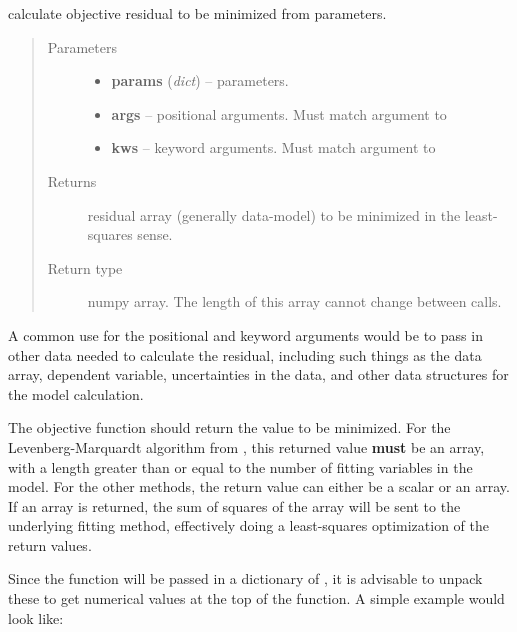 \documentclass[letterpaper,10pt,english]{sphinxmanual}
\begin{document}
\begin{fulllineitems}
calculate objective residual to be minimized from parameters.
\begin{quote}\begin{description}
\item[{Parameters}] \leavevmode\begin{itemize}
\item {} 
\textbf{params} (\emph{dict}) -- parameters.

\item {} 
\textbf{args} -- positional arguments.  Must match  argument to {\hyperref[fitting:minimize]{}}

\item {} 
\textbf{kws} -- keyword arguments.  Must match  argument to {\hyperref[fitting:minimize]{}}

\end{itemize}

\item[{Returns}] \leavevmode
residual array (generally data-model) to be minimized in the least-squares sense.

\item[{Return type}] \leavevmode
numpy array.  The length of this array cannot change between calls.

\end{description}\end{quote}

\end{fulllineitems}


A common use for the positional and keyword arguments would be to pass in other
data needed to calculate the residual, including such things as the data array,
dependent variable, uncertainties in the data, and other data structures for the
model calculation.

The objective function should return the value to be minimized.  For the
Levenberg-Marquardt algorithm from {\hyperref[fitting:leastsq]{}}, this returned value \textbf{must} be an
array, with a length greater than or equal to the number of fitting variables in the
model.  For the other methods, the return value can either be a scalar or an array.  If an
array is returned, the sum of squares of the array will be sent to the underlying fitting
method, effectively doing a least-squares optimization of the return values.

Since the function will be passed in a dictionary of {\hyperref[parameters:Parameters]{}}, it is advisable
to unpack these to get numerical values at the top of the function.  A simple example
would look like:
\end{document}
